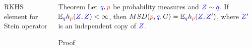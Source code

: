 \begin{frame}
\begin{columns}
\begin{column}{.33\linewidth}
\begin{block}{RKHS element for Stein operator}
\vspace{0.5cm}
\end{block}

\vspace{-0.75cm}



 


\end{column}

\hspace{-1.45cm}
\begin{column}{.33\linewidth}


\begin{block}{Theorem}
\large
Let ${ \color{blue} q},{\color{red} p}$ be probability measures and ${ \color{blue} Z}\sim { \color{blue} q}$. 
If $\mathbb{E}_{{ \color{blue} q}} h_{{\color{red} p}}({ \color{blue} Z},{ \color{blue} Z})<\infty$, then 
$MSD({\color{red} p},{ \color{blue} q},G) = \mathbb{E}_{{ \color{blue} q}} h_{{\color{red} p}}({ \color{blue} Z},{ \color{blue} Z}')$,
where ${ \color{blue} Z}'$ is an independent copy of ${ \color{blue} Z}$.
\end{block}

\vspace{-0.73cm}
\begin{block}{Proof}


\end{block}
\end{column}
\end{columns}
\end{frame}
